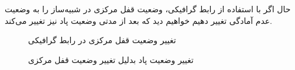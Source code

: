 {    حال اگر با استفاده از رابط گرافیکی، وضعیت قفل مرکزی در شبیه‌ساز را به وضعیت عدم آمادگی تغییر دهیم خواهیم دید که بعد از مدتی وضعیت پاد نیز تغییر می‌کند.
    \begin{figure}[H]
        \caption{تغییر وضعیت قفل مرکزی در رابط گرافیکی}
        \label{fig:dash_lock_main_change_readiness}
    \end{figure}

    \begin{figure}[H]
        \caption{تغییر وضعیت پاد بدلیل تغییر وضعیت قفل مرکزی}
        \label{fig:dash_pod_lock_main_change readiness}
    \end{figure}
}